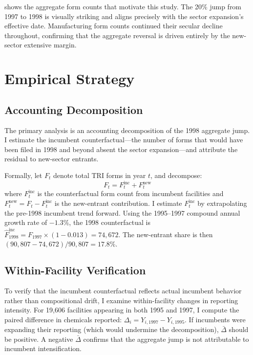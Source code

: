 \documentclass[12pt]{article}
\begin{document}
 shows the aggregate form counts that motivate this study. The 20\% jump from 1997 to 1998 is visually striking and aligns precisely with the sector expansion's effective date. Manufacturing form counts continued their secular decline throughout, confirming that the aggregate reversal is driven entirely by the new-sector extensive margin.



\section{Empirical Strategy}

\subsection{Accounting Decomposition}

The primary analysis is an accounting decomposition of the 1998 aggregate jump. I estimate the incumbent counterfactual---the number of forms that would have been filed in 1998 and beyond absent the sector expansion---and attribute the residual to new-sector entrants.

Formally, let $F_t$ denote total TRI forms in year $t$, and decompose:
\begin{equation}
F_t = F_t^{\text{inc}} + F_t^{\text{new}}
\label{eq:decomp}
\end{equation}
where $F_t^{\text{inc}}$ is the counterfactual form count from incumbent facilities and $F_t^{\text{new}} = F_t - F_t^{\text{inc}}$ is the new-entrant contribution. I estimate $F_t^{\text{inc}}$ by extrapolating the pre-1998 incumbent trend forward. Using the 1995--1997 compound annual growth rate of $-1.3\%$, the 1998 counterfactual is $\hat{F}_{1998}^{\text{inc}} = F_{1997} \times (1 - 0.013) = 74{,}672$. The new-entrant share is then $(90{,}807 - 74{,}672) / 90{,}807 = 17.8\%$.

\subsection{Within-Facility Verification}

To verify that the incumbent counterfactual reflects actual incumbent behavior rather than compositional drift, I examine within-facility changes in reporting intensity. For 19,606 facilities appearing in both 1995 and 1997, I compute the paired difference in chemicals reported: $\Delta_i = Y_{i,1997} - Y_{i,1995}$. If incumbents were expanding their reporting (which would undermine the decomposition), $\bar{\Delta}$ should be positive. A negative $\bar{\Delta}$ confirms that the aggregate jump is not attributable to incumbent intensification.
\end{document}
